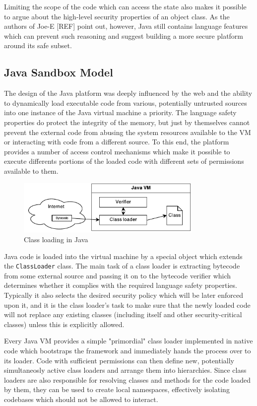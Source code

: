 \documentclass[a4paper,12pt,twoside,openright]{report}
\newcommand{\class}[1]{\texttt{#1}}
\begin{document}
Limiting the scope of the code which can access the state also makes it possible to argue about the high-level security properties of an object class. As the authors of Joe-E [REF] point out, however, Java still contains language features which can prevent such reasoning and suggest building a more secure platform around its safe subset.

\subsection{Java Sandbox Model}

The design of the Java platform was deeply influenced by the web and the ability to dynamically load executable code from various, potentially untrusted sources into one instance of the Java virtual machine a priority. The language safety properties do protect the integrity of the memory, but just by themselves cannot prevent the external code from abusing the system resources available to the VM or interacting with code from a different source. To this end, the platform provides a number of access control mechanisms which make it possible to execute differents portions of the loaded code with different sets of permissions available to them. 

\begin{figure}
	\centering
	\includegraphics[width=0.8\textwidth]{dia_java_classload.pdf}
	\caption{Class loading in Java}
\end{figure}

Java code is loaded into the virtual machine by a special object which extends the \class{ClassLoader} class. The main task of a class loader is extracting bytecode from some external source and passing it on to the bytecode verifier which determines whether it complies with the required language safety properties. Typically it also selects the desired security policy which will be later enforced upon it, and it is the class loader's task to make sure that the newly loaded code will not replace any existing classes (including itself and other security-critical classes) unless this is explicitly allowed. 

Every Java VM provides a simple "primordial" class loader implemented in native code which bootstraps the framework and immediately hands the process over to its loader. Code with sufficient permissions can then define new, potentially simultaneosly active class loaders and arrange them into hierarchies. Since class loaders are also responsible for resolving classes and methods for the code loaded by them, they can be used to create local namespaces, effectively isolating codebases which should not be allowed to interact.
\end{document}
